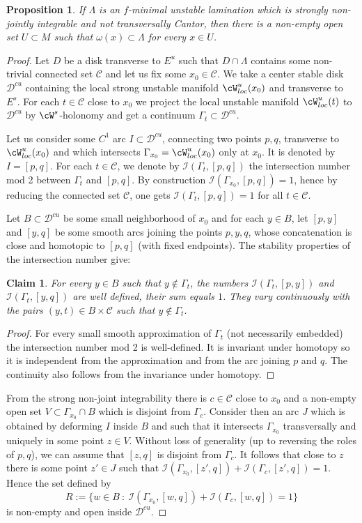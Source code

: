 \documentclass[a4paper,11pt]{amsart}
\numberwithin{equation}{section}     %
\def\cC{\mathcal{C}}  \def\cI{\mathcal{I}} \def\cO{\mathcal{O}} \def\cU{\mathcal{U}}
\def\cD{\mathcal{D}}  \def\cJ{\mathcal{J}} \def\cP{\mathcal{P}} \def\cV{\mathcal{V}}
\newtheorem*{af}{Claim}
\newtheorem{prop}[teo]{Proposition}
\theoremstyle{definition}
\theoremstyle{remark}
\begin{document}
\begin{prop}\label{prop-lamtransvcantor}
If $\Lambda$ is an $f$-minimal unstable lamination which is strongly non-jointly integrable and not transversally Cantor, then there is a non-empty open set $U \subset M$ such that $\omega(x) \subset \Lambda$ for every $x \in U$.
\end{prop}

\begin{proof}
Let $D$ be a disk transverse to $E^u$ such that $D \cap \Lambda$ contains some non-trivial connected set $\cC$ and let us fix some $x_0 \in \cC$. We take a center stable disk $\cD^{cu}$ containing the local strong unstable manifold $\cW^{u}_{loc}(x_0)$ and transverse to $E^s$.
For each $t\in \cC$ close to $x_0$ we project the local unstable manifold $\cW^{u}_{loc}(t)$ to $\cD^{cu}$
by $\cW^s$-holonomy and get a continuum $\Gamma_t\subset \cD^{cu}$.

Let us consider some $C^1$ arc $I\subset \cD^{cu}$, connecting two points $p,q$, transverse to $\cW^{u}_{loc}(x_0)$
and which intersects $\Gamma_{x_0}=\cW^{u}_{loc}(x_0)$ only at $x_0$. It is denoted by $I=[p,q]$. For each $t\in \cC$, we denote by $\cI(\Gamma_{t},[p,q])$ the intersection number mod 2 between
$\Gamma_t$ and $[p,q]$. By construction $\cI(\Gamma_{x_0},[p,q])=1$, hence by reducing the connected set $\cC$,
one gets $\cI(\Gamma_t, [p,q])=1$ for all $t \in \cC$.

Let  $B \subset \cD^{cu}$ be some small neighborhood of $x_0$ and for each $y\in B$, let $[p,y]$ and $[y,q]$
be some smooth arcs joining the points $p,y,q$, whose concatenation is close and homotopic to $[p,q]$ (with fixed endpoints). The stability properties of the intersection number give:
\begin{af}
For every $y \in B$ such that $y \notin \Gamma_t$, the numbers $\cI(\Gamma_t, [p,y])$ and $\cI(\Gamma_t, [y,q])$ are well defined, their sum equals $1$. They vary continuously with the pairs $(y,t) \in B\times \cC$ such that $y \notin \Gamma_t$.
\end{af}
\begin{proof}
For every small smooth approximation of $\Gamma_t$ (not necessarily embedded) the intersection number mod 2 is well-defined. It is invariant under homotopy so it is independent from the approximation and from the arc joining $p$ and $q$. The continuity also follows from the invariance under homotopy. 
\end{proof}

From the strong non-joint integrability there is $c\in \cC$ close to $x_0$ and
a non-empty open set $V\subset \Gamma_{x_0}\cap B$ which is disjoint from $\Gamma_{c}$. Consider then an arc $J$ which is obtained by deforming $I$ inside $B$ and such that it intersects $\Gamma_{x_0}$ transversally and uniquely in some point $z \in V$. Without loss of generality (up to reversing the roles of $p,q$), we can assume that $[z,q]$ is disjoint from $\Gamma_c$.  It follows that close to $z$ there is some point $z' \in J$ such that $\cI(\Gamma_{x_0},[z',q]) + \cI(\Gamma_c, [z',q]) = 1$. Hence the set defined by
$$R:= \{w \in B \ : \ \cI(\Gamma_{x_0},[w,q]) + \cI(\Gamma_c, [w,q]) = 1\}$$ is non-empty and open inside $\cD^{cu}$.


\end{proof}
\end{document}
